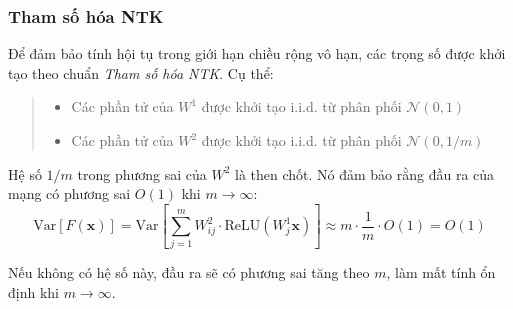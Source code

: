 \subsubsection{Tham số hóa NTK}

Để đảm bảo tính hội tụ trong giới hạn chiều rộng vô hạn, các trọng số được khởi tạo theo chuẩn \textit{Tham số hóa NTK}. Cụ thể:
\begin{quote}
\begin{itemize}
    \item Các phần tử của $W^1$ được khởi tạo i.i.d. từ phân phối $\mathcal{N}(0, 1)$
    \item Các phần tử của $W^2$ được khởi tạo i.i.d. từ phân phối $\mathcal{N}(0, 1/m)$
\end{itemize}
\end{quote}

Hệ số $1/m$ trong phương sai của $W^2$ là then chốt. Nó đảm bảo rằng đầu ra của mạng có phương sai $O(1)$ khi $m \rightarrow \infty$:
\begin{equation}
    \text{Var}[F(\mathbf{x})] = \text{Var}\left[\sum_{j=1}^{m} W^2_{ij} \cdot \text{ReLU}(W^1_j \mathbf{x})\right] \approx m \cdot \frac{1}{m} \cdot O(1) = O(1)
\end{equation}

Nếu không có hệ số này, đầu ra sẽ có phương sai tăng theo $m$, làm mất tính ổn định khi $m \rightarrow \infty$.


